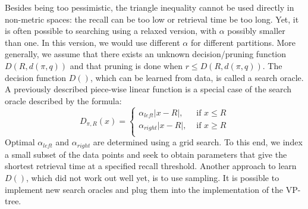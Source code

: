 \documentclass[runningheads,a4paper]{llncs}
\begin{document}
{Besides being too pessimistic, the triangle inequality cannot be used directly in non-metric spaces:
the recall can be too low or retrieval time be too long.
Yet, it is often possible to searching using a relaxed version, with $\alpha$ possibly smaller than one.
In this version, we would use different $\alpha$ for different partitions.
More generally, we assume that there exists an unknown decision/pruning function $D(R, d(\pi, q))$ and
that pruning is done when $r \le D(R, d(\pi, q))$.
The decision function $D()$, which can be learned from data, is called a search oracle.
A previously described piece-wise linear function is a special case of the search oracle described by the formula:
\begin{equation}\label{EqDecFunc}
D_{\pi,R}(x) = \left\{
\begin{array}{ll}
\alpha_{left} |x - R|,  & \mbox{ if }x \le R\\
\alpha_{right} |x - R|, & \mbox{ if }x \ge R\\
\end{array}
\right.
\end{equation}
Optimal $\alpha_{left}$ and $\alpha_{right}$ are determined using a grid search.
To this end, we index a small subset of the data points
and seek to obtain parameters that give the shortest retrieval time 
at a specified recall threshold.
Another approach to learn $D()$, which did not work out well yet, is to use sampling.
It is possible to implement new search oracles and plug them into the implementation of the VP-tree.


}
\end{document}
